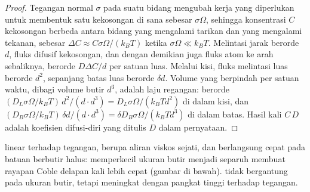 \begin{proof}
Tegangan normal $\sigma$ pada suatu bidang mengubah kerja yang diperlukan untuk membentuk satu kekosongan
di sana sebesar $\sigma\Omega$, sehingga konsentrasi $C$ kekosongan berbeda antara
bidang yang mengalami tarikan dan yang mengalami tekanan, sebesar $\Delta C \approx C\sigma\Omega/
(k_BT)$ ketika $\sigma\Omega \ll k_BT$. Melintasi jarak berorde $d$, fluks
difusif kekosongan, dan dengan demikian juga fluks atom ke arah sebaliknya, berorde $D\Delta
C/d$ per satuan luas. Melalui kisi, fluks melintasi luas berorde
$d^2$, sepanjang batas luas berorde $\delta d$. Volume yang berpindah per
satuan waktu, dibagi volume butir $d^3$, adalah laju regangan: berorde
$(D_L\sigma\Omega/k_BT)\,d^2/(d\cdot d^3) = D_L\sigma\Omega/(k_BTd^2)$ di dalam
kisi, dan $(D_B\sigma\Omega/k_BT)\,\delta d/(d\cdot d^3) = \delta D_B
\sigma\Omega/(k_BTd^3)$ di dalam batas. Hasil kali $C\,D$ adalah
koefisien difusi-diri yang ditulis $D$ dalam pernyataan.
\end{proof}

 linear terhadap tegangan, berupa aliran viskos sejati, dan berlangsung cepat pada
batuan berbutir halus: memperkecil ukuran butir menjadi separuh membuat rayapan Coble delapan kali lebih cepat
(gambar di bawah).  tidak bergantung pada ukuran butir, tetapi meningkat
dengan pangkat tinggi terhadap tegangan.

